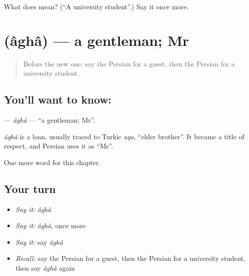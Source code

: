 \begin{tcolorbox}[breakable,colback=teal!4,colframe=teal!35!black,title={Before you move on}]
What does  mean? (\textquotedblleft{}A university student\textquotedblright{}.) Say it once more.
\end{tcolorbox}
\section[\texorpdfstring{\fa{آقا} (âghâ)}{آقا (âghâ)}]{ (âghâ) — a gentleman; Mr}

\label{lesson:FA-C34-agha}



\begin{quote}
Before the new one: say the Persian for a guest, then the Persian for a university student.
\end{quote}

\subsection*{You'll want to know: }
\textbf{} — \emph{âghâ} — \textquotedblleft{}a gentleman; Mr\textquotedblright{}.

\begin{cousinweb}
\emph{âghâ} is a loan, usually traced to Turkic \emph{aqa}, \textquotedblleft{}elder brother\textquotedblright{}. It became a title of respect, and Persian uses it as \textquotedblleft{}Mr\textquotedblright{}.
\end{cousinweb}

\begin{grammarlens}[title={What you've built}]
One more word for this chapter.
\end{grammarlens}

\subsection*{Your turn}
\begin{itemize}
\raggedright
  \item \emph{Say it:} \emph{âghâ}
  \item \emph{Say it:} \emph{âghâ}, once more
  \item \emph{Say it:} say \emph{âghâ}
  \item \emph{Recall:} say the Persian for a guest, then the Persian for a university student, then say \emph{âghâ} again
\end{itemize}

